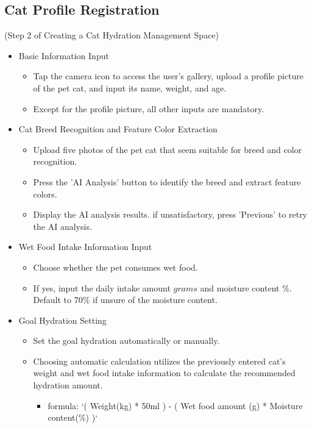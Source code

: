 \documentclass[conference]{IEEEtran}
\begin{document}
\subsection{Cat Profile Registration}
(Step 2 of Creating a Cat Hydration Management Space)
\begin{itemize}
\item{Basic Information Input}
    \begin{itemize}
        \item Tap the camera icon to access the user's gallery, upload a profile picture of the pet cat, and input its name, weight, and age. 
        \item Except for the profile picture, all other inputs are mandatory.
    \end{itemize}
\item{Cat Breed Recognition and Feature Color Extraction}
    \begin{itemize}
        \item Upload five photos of the pet cat that seem suitable for breed and color recognition.
        \item Press the 'AI Analysis' button to identify the breed and extract feature colors.
        \item Display the AI analysis results. if unsatisfactory, press 'Previous' to retry the AI analysis.
    \end{itemize}
\item{Wet Food Intake Information Input}
    \begin{itemize}
        \item Choose whether the pet consumes wet food.
        \item If yes, input the daily intake amount \(grams\) and moisture content \(\%\). Default to 70\% if unsure of the moisture content.
    \end{itemize}
\item{Goal Hydration Setting}
    \begin{itemize}
        \item Set the goal hydration automatically or manually.
        \item Choosing automatic calculation utilizes the previously entered cat's weight and wet food intake information to calculate the recommended hydration amount.
        \begin{itemize}
            \item formula: `( Weight(kg) * 50ml ) - ( Wet food amount (g) * Moisture content(\%) )`\\
        \end{itemize}
    \end{itemize}
\end{itemize}
\end{document}
